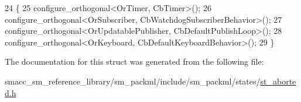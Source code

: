 \begin{DoxyCode}
24     \{
25         configure\_orthogonal<OrTimer, CbTimer>();   
26         configure\_orthogonal<OrSubscriber, CbWatchdogSubscriberBehavior>();
27         configure\_orthogonal<OrUpdatablePublisher, CbDefaultPublishLoop>();
28         configure\_orthogonal<OrKeyboard, CbDefaultKeyboardBehavior>();
29     \}
\end{DoxyCode}


The documentation for this struct was generated from the following file\+:\begin{DoxyCompactItemize}
\item 
smacc\+\_\+sm\+\_\+reference\+\_\+library/sm\+\_\+packml/include/sm\+\_\+packml/states/\hyperlink{st__aborted_8h}{st\+\_\+aborted.\+h}\end{DoxyCompactItemize}
